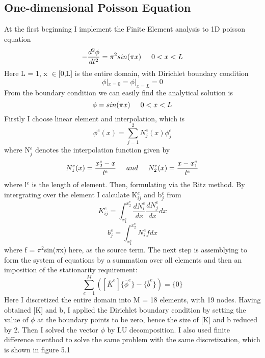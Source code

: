 \documentclass[journal]{IEEEtran}
\begin{document}
\subsection{One-dimensional Poisson Equation}
At the first beginning I implement the Finite Element analysis to 1D poisson equation
\begin{equation}
-\frac{d^2\phi}{dt^2} = \pi^2sin(\pi x) \hspace{0.5cm} 0<x<L 
\end{equation} 
Here L = 1, x $\in$[0,L] is the entire domain, with Dirichlet boundary condition
\begin{equation}
\phi|_{x=0} = \phi|_{x=L} = 0
\end{equation}
From the boundary condition we can easily find the analytical solution is 
\begin{equation}
\phi = sin(\pi x) \hspace{0.5cm} 0<x<L 
\end{equation}
Firstly I choose linear element and interpolation, which is 
\begin{equation}
\phi^e(x) = \sum_{j=1}^{2}N_j^e(x)\phi^e_j
\end{equation}
where N$^e_j$ denotes the interpolation function given by
\begin{align*}
N^e_1(x) = \frac{x^e_2-x}{l^e} \hspace{0.5cm} and \hspace{0.5cm} N^e_2(x) = \frac{x-x^e_1}{l^e}
\end{align*}
where l$^e$ is the length of element. Then, formulating via the Ritz method. By intergrating over the element I calculate K$^e_{ij}$ and b$^e_j$ from
\begin{equation}
K^e_{ij} =\int_{x_1^e}^{x_2^e}\frac{dN^e_i}{dx} \frac{dN^e_j}{dx} dx
\end{equation}
\begin{equation}
b^e_j = \int_{x_1^e}^{x_2^e}N_i^efdx
\end{equation}
where f = $\pi^2$sin($\pi$x) here, as the source term. 
The next step is assemblying to form the system of equations by a summation over all elements and then an imposition of the stationarity requirement:
\begin{equation}
\sum_{e=1}^{M}([\overline{K}^e]\{\overline{\phi}^e\} - \{\overline{b}^e\}) = \{0\}
\end{equation}
Here I discretized the entire domain into M = 18 elements, with 19 nodes. Having obtained [K] and {b}, I applied the Dirichlet boundary condition by setting the value of $\phi$ at the boundary points to be zero, hence the size of [K] and {b} reduced by 2. Then I solved the vector {$\phi$} by LU decomposition. I also used finite difference menthod to solve the same problem with the same discretization, which is shown in figure 5.1
\end{document}
